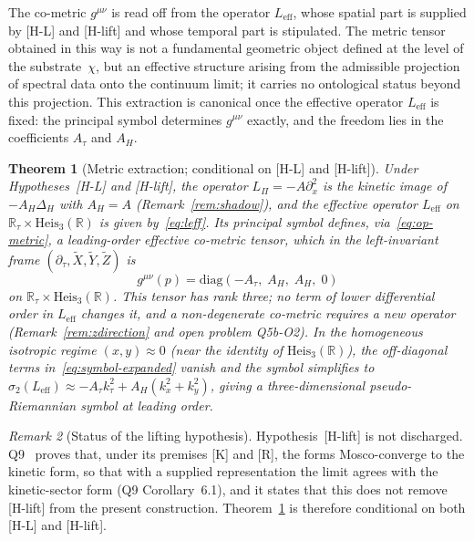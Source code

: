 \documentclass[11pt,a4paper]{article}
\newtheorem{theorem}{Theorem}[section]
\theoremstyle{definition}
\theoremstyle{remark}
\newtheorem{remark}[theorem]{Remark}
\newcommand{\HeisR}{\mathrm{Heis}_3(\mathbb{R})}
\newcommand{\DeltaH}{\Delta_H}
\newcommand{\LPi}{L_\Pi}
\begin{document}
    The co-metric $g^{\mu\nu}$ is read off from the operator $L_{\mathrm{eff}}$, whose spatial part is supplied by
    [H-L] and [H-lift] and whose temporal part is stipulated.
    The metric tensor obtained in this way is not a fundamental geometric object
    defined at the level of the substrate~$\chi$, but an effective structure arising
    from the admissible projection of spectral data onto the continuum limit;
    it carries no ontological status beyond this projection.
    This extraction is canonical once the effective operator $L_{\mathrm{eff}}$ is fixed: the principal symbol
    determines $g^{\mu\nu}$ exactly, and the freedom lies in the coefficients $A_\tau$ and $A_H$.

    \begin{theorem}[Metric extraction; conditional on {[H-L]} and {[H-lift]}]
      \label{thm:metric}
      Under Hypotheses~[H-L] and [H-lift], the operator $\LPi = -A\partial_x^2$ is the kinetic image of
      $-A_H\DeltaH$ with $A_H = A$ (Remark~\ref{rem:shadow}), and the effective operator $L_{\mathrm{eff}}$ on
      $\mathbb{R}_\tau \times \HeisR$ is given by~\eqref{eq:leff}.
      Its principal symbol defines, via~\eqref{eq:op-metric}, a leading-order effective
      co-metric tensor, which in the left-invariant frame $(\partial_\tau, \tilde X, \tilde Y, \tilde Z)$ is
      \begin{equation}
        g^{\mu\nu}(p) = \mathrm{diag}(-A_\tau,\; A_H,\; A_H,\; 0)
        \label{eq:metric-tensor}
      \end{equation}
      on $\mathbb{R}_\tau \times \HeisR$.
      This tensor has rank three; no term of lower differential order in $L_{\mathrm{eff}}$ changes it, and a
      non-degenerate co-metric requires a new operator (Remark~\ref{rem:zdirection} and open problem Q5b-O2).
      In the homogeneous isotropic regime $(x, y) \approx 0$ (near the identity of $\HeisR$),
      the off-diagonal terms in~\eqref{eq:symbol-expanded} vanish and the symbol simplifies to
      $\sigma_2(L_{\mathrm{eff}}) \approx -A_\tau k_\tau^2 + A_H (k_x^2 + k_y^2)$,
      giving a three-dimensional pseudo-Riemannian symbol at leading order.
    \end{theorem}

    \begin{remark}[Status of the lifting hypothesis]
      \label{rem:q9lift}
      Hypothesis~[H-lift] is not discharged.
      Q9~\cite{Beau2026q9} proves that, under its premises [K] and [R], the forms Mosco-converge to the kinetic form,
      so that with a supplied representation the limit agrees with the kinetic-sector form (Q9 Corollary~6.1), and it
      states that this does not remove [H-lift] from the present construction.
      Theorem~\ref{thm:metric} is therefore conditional on both [H-L] and [H-lift].
    \end{remark}
\end{document}
